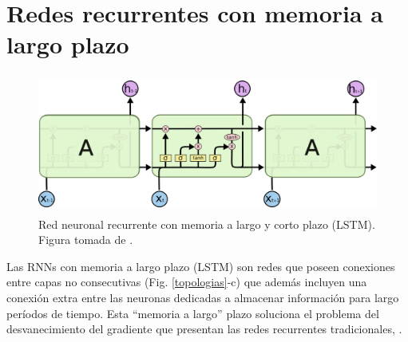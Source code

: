 
\section{Redes recurrentes con memoria a largo plazo}


\begin{figure}[h!]
  \begin{center}
    \includegraphics[height=1.8in]{Figures/LSTM3-chain.png}
    \caption{ Red neuronal recurrente con memoria a largo y corto plazo (LSTM). Figura tomada de \cite{olah}. }
    \label{LSTM}
  \end{center}
\end{figure}

Las RNNs con memoria a largo plazo (LSTM) son redes que poseen conexiones entre capas 
no consecutivas (Fig. \ref{topologias}-c) que además incluyen una conexión extra entre las neuronas dedicadas
 a almacenar información para largo períodos de tiempo. 
 Esta ``memoria a largo'' plazo soluciona el problema del desvanecimiento del gradiente que presentan las redes recurrentes 
 tradicionales\cite{Kratzert}, \cite{olah}.

